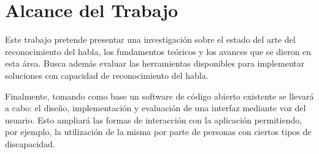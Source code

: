\section{Alcance del Trabajo}
\label{sec:alcance}

Este trabajo pretende presentar una investigaci\'{o}n sobre el estado del arte del reconocimiento del habla, 
los fundamentos te\'{o}ricos y los avances que se dieron en esta \'{a}rea. Busca adem\'{a}s evaluar las 
herramientas disponibles para implementar soluciones con capacidad de reconocimiento del habla. 

Finalmente, tomando como base un software de c\'{o}digo abierto existente se llevar\'{a} a cabo: 
el dise\~{n}o, implementaci\'{o}n y evaluaci\'{o}n de una interfaz mediante voz del usuario. 
Esto ampliar\'{a} las formas de interacci\'{o}n con la aplicaci\'{o}n permitiendo, por ejemplo, 
la utilizaci\'{o}n de la misma por parte de personas con ciertos tipos de discapacidad.

